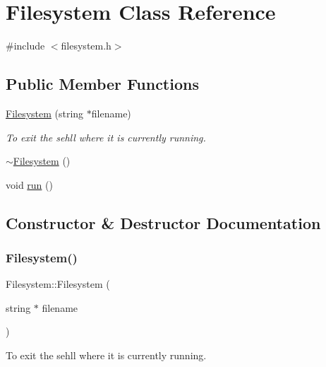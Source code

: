 \hypertarget{class_filesystem}{}\section{Filesystem Class Reference}
\label{class_filesystem}


{\ttfamily \#include $<$filesystem.\+h$>$}

\subsection*{Public Member Functions}
\begin{DoxyCompactItemize}
\item 
\hyperlink{class_filesystem_aac89cbe467cc517e80049e0277812040}{Filesystem} (string $\ast$filename)
\begin{DoxyCompactList}\small\item\em To exit the sehll where it is currently running. \end{DoxyCompactList}\item 
\hyperlink{class_filesystem_a8d4d73d3d4e56fd6792bdb83f6c5dfd8}{$\sim$\+Filesystem} ()
\item 
void \hyperlink{class_filesystem_a373c34da491ec8d269cbc18d52a1ad79}{run} ()
\end{DoxyCompactItemize}


\subsection{Constructor \& Destructor Documentation}
\mbox{\label{class_filesystem_aac89cbe467cc517e80049e0277812040}} 
\subsubsection{\texorpdfstring{Filesystem()}{Filesystem()}}
{\footnotesize\ttfamily Filesystem\+::\+Filesystem (\begin{DoxyParamCaption}\item[{string $\ast$}]{filename }\end{DoxyParamCaption})\hspace{0.3cm}{\ttfamily [inline]}}



To exit the sehll where it is currently running. 

\mbox{\label{class_filesystem_a8d4d73d3d4e56fd6792bdb83f6c5dfd8}} 
